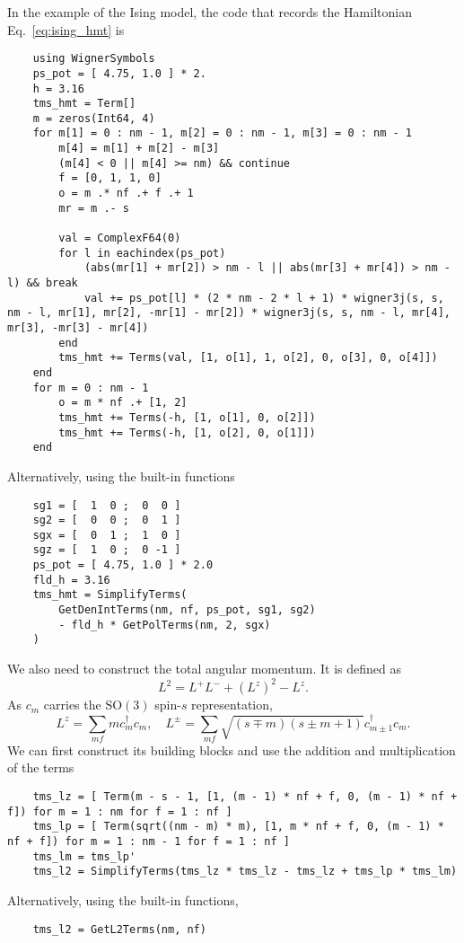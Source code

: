 \documentclass{timesjhep}
\begin{document}
In the example of the Ising model, the code that records the Hamiltonian Eq.~\eqref{eq:ising_hmt} is
\begin{lstlisting}
    using WignerSymbols
    ps_pot = [ 4.75, 1.0 ] * 2.
    h = 3.16
    tms_hmt = Term[]
    m = zeros(Int64, 4)
    for m[1] = 0 : nm - 1, m[2] = 0 : nm - 1, m[3] = 0 : nm - 1
        m[4] = m[1] + m[2] - m[3]
        (m[4] < 0 || m[4] >= nm) && continue
        f = [0, 1, 1, 0]
        o = m .* nf .+ f .+ 1
        mr = m .- s

        val = ComplexF64(0)
        for l in eachindex(ps_pot)
            (abs(mr[1] + mr[2]) > nm - l || abs(mr[3] + mr[4]) > nm - l) && break
            val += ps_pot[l] * (2 * nm - 2 * l + 1) * wigner3j(s, s, nm - l, mr[1], mr[2], -mr[1] - mr[2]) * wigner3j(s, s, nm - l, mr[4], mr[3], -mr[3] - mr[4])
        end
        tms_hmt += Terms(val, [1, o[1], 1, o[2], 0, o[3], 0, o[4]])
    end
    for m = 0 : nm - 1
        o = m * nf .+ [1, 2]
        tms_hmt += Terms(-h, [1, o[1], 0, o[2]])
        tms_hmt += Terms(-h, [1, o[2], 0, o[1]])
    end
\end{lstlisting}
Alternatively, using the built-in functions
\begin{lstlisting}
    sg1 = [  1  0 ;  0  0 ]
    sg2 = [  0  0 ;  0  1 ]
    sgx = [  0  1 ;  1  0 ]
    sgz = [  1  0 ;  0 -1 ]
    ps_pot = [ 4.75, 1.0 ] * 2.0
    fld_h = 3.16
    tms_hmt = SimplifyTerms(
        GetDenIntTerms(nm, nf, ps_pot, sg1, sg2)
        - fld_h * GetPolTerms(nm, 2, sgx)
    )
\end{lstlisting}

We also need to construct the total angular momentum. It is defined as
\begin{equation}
    L^2=L^+L^-+(L^z)^2-L^z.
\end{equation}
As $c_m$ carries the $\mathrm{SO}(3)$ spin-$s$ representation,
\begin{equation}
    L^z=\sum_{mf}mc_m^\dagger c_m,\quad L^\pm=\sum_{mf}\sqrt{(s\mp m)(s\pm m+1)}c^\dagger_{m\pm 1}c_m.
\end{equation}
We can first construct its building blocks and use the addition and multiplication of the terms
\begin{lstlisting}
    tms_lz = [ Term(m - s - 1, [1, (m - 1) * nf + f, 0, (m - 1) * nf + f]) for m = 1 : nm for f = 1 : nf ]
    tms_lp = [ Term(sqrt((nm - m) * m), [1, m * nf + f, 0, (m - 1) * nf + f]) for m = 1 : nm - 1 for f = 1 : nf ]
    tms_lm = tms_lp'
    tms_l2 = SimplifyTerms(tms_lz * tms_lz - tms_lz + tms_lp * tms_lm)
\end{lstlisting}
Alternatively, using the built-in functions,
\begin{lstlisting}
    tms_l2 = GetL2Terms(nm, nf)
\end{lstlisting}
\end{document}
